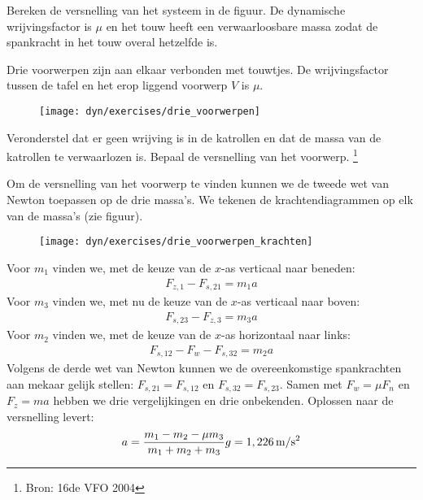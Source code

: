 \documentclass{ximera}
\begin{document}
\begin{exercise} Bereken de versnelling van het systeem in de figuur. De dynamische wrijvingsfactor is $\mu$ en het touw heeft een verwaarloosbare massa zodat de spankracht in het touw overal hetzelfde is. 


\end{exercise}

\begin{exercise} Drie voorwerpen zijn aan elkaar verbonden met touwtjes. De wrij\-vings\-factor tussen de tafel en het erop liggend voorwerp $V$ is $\mu$.
\begin{figure}[h]
\begin{center}
\texttt{[image: dyn/exercises/drie\_voorwerpen]}
\end{center}
\end{figure}
Veronderstel dat er geen wrijving is in de katrollen en dat de massa van de katrollen te verwaarlozen is. Bepaal de versnelling van het voorwerp. \footnote{Bron: 16de VFO 2004}
\begin{oplossing}
\newline
Om de versnelling van het voorwerp te vinden kunnen we de tweede wet van Newton toepassen op de drie massa's. We tekenen de krachtendiagrammen op elk van de massa's (zie figuur). 
\begin{figure}[h]
\begin{center}
\texttt{[image: dyn/exercises/drie\_voorwerpen\_krachten]}
\end{center}
\end{figure}

Voor $m_1$ vinden we, met de keuze van de $x$-as verticaal naar beneden:
\begin{eqnarray}
F_{z,1}-F_{s,21}=m_1a\label{m_1}
\end{eqnarray}
Voor $m_3$ vinden we, met nu de keuze van de $x$-as verticaal naar boven:
\begin{eqnarray}
F_{s,23}-F_{z,3}=m_3a\label{m_3}
\end{eqnarray}
Voor $m_2$ vinden we, met de keuze van de $x$-as horizontaal naar links:
\begin{eqnarray}
F_{s,12}-F_w-F_{s,32}=m_2a\label{m_2}
\end{eqnarray}
Volgens de derde wet van Newton kunnen we de overeenkomstige spankrachten aan mekaar gelijk stellen: $F_{s,21}=F_{s,12}$ en $F_{s,32}=F_{s,23}$. Samen met $F_w=\mu F_n$ en $F_z=ma$ hebben we drie vergelijkingen en drie onbekenden. Oplossen naar de versnelling levert:
\begin{eqnarray*}
a=\frac{m_1-m_2-\mu m_3}{m_1+m_2+m_3}g=1,226\rm\,m/s^2
\end{eqnarray*}


\end{oplossing}
\end{exercise}
\end{document}
